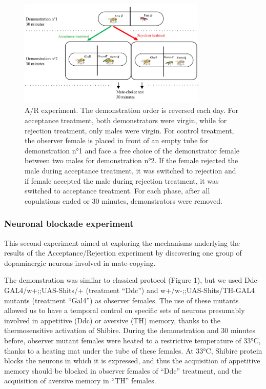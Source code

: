 \documentclass[a4paper, 12pt]{article}
\begin{document}
		\begin{figure}[h]
		\centering
		\includegraphics[width=0.8\textwidth]{images/ar}
		\caption{A/R experiment. 
			The demonstration order is reversed each day. For acceptance treatment, both demonstrators were virgin, while for rejection treatment, only males were virgin. For control treatment, the observer female is placed in front of an empty tube for demonstration n°1 and face a free choice of the demonstrator female between two males for demonstration n°2. If the female rejected the male during acceptance treatment, it was switched to rejection and if female accepted the male during rejection treatment, it was switched to acceptance treatment. For each phase, after all copulations ended or 30 minutes, demonstrators were removed.}
		\label{fig:ar}
	\end{figure}
	
	\subsubsection{Neuronal blockade experiment}
	
	This second experiment aimed at exploring the mechanisms underlying the results of the Acceptance/Rejection experiment by discovering one group of dopaminergic neurons involved in mate-copying.
	
	The demonstration was similar to classical protocol (Figure 1), but we used Ddc-GAL4/w+;;UAS-Shits/+ (treatment “Ddc”) and w+/w-;;UAS-Shits/TH-GAL4 mutants (treatment “Gal4”) as observer females. The use of these mutants allowed us to have a temporal control on specific sets of neurons presumably involved in appetitive (Ddc) or aversive (TH) memory, thanks to the thermosensitive activation of Shibire. During the demonstration and 30 minutes before, observer mutant females were heated to a restrictive temperature of 33°C, thanks to a heating mat under the tube of these females. At 33°C, Shibire protein blocks the neurons in which it is expressed, and thus the acquisition of appetitive memory should be blocked in observer females of “Ddc” treatment, and the acquisition of aversive memory in “TH” females. 
	
\end{document}
